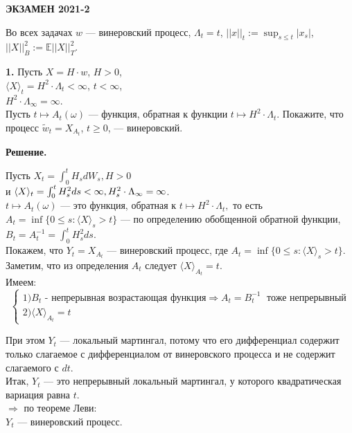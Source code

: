 \documentclass[12pt]{article}
\newcommand\E{{\mathbb E}}
\begin{document}
\centerline{\bf \Large ЭКЗАМЕН 2021-2}
\bigskip 
\bigskip
\bigskip
Во всех  задачах $w$ --- винеровский процесс, $\Lambda_t=t$, $||x||_t:=\sup_{s\le t}|x_s|$, 
$||X||_B^2:=\E ||X||^2_T$.   

\bigskip
\noindent
{\bf 1.} 
Пусть $X=H\cdot w$, $H>0$, \\
$\langle X\rangle_t=  H^2\cdot \Lambda_t<\infty$, $t<\infty$, \\
$H^2\cdot \Lambda_\infty=\infty$. \\
Пусть $t\mapsto A_t(\omega)$ ---  функция, обратная к функции  $t\mapsto H^2\cdot \Lambda_t$.
Покажите, что процесс  $\tilde w_t=X_{A_t}$, $t\ge 0$, --- винеровский. 

\smallskip
{\bf  Решение.}  

Пусть $X_t=\int_0^t H_s dW_s, H>0$ \\
и $\langle X\rangle_t=\int_0^t H_s^2 ds <\infty, \\
H_s^2\cdot\Lambda_\infty=\infty$. \\
$t\mapsto A_t(\omega)$ — это функция, обратная к $t\mapsto H^2\cdot \Lambda_t,$ то есть $A_t=\inf\{0\le s : \langle X\rangle_s>t\} $ — по определению обобщенной обратной функции,\\
 $B_t= A_t^{-1}=\int_0^t H_s^2 ds.$\\ 
Покажем, что $Y_t=X_{A_t}$ — винеровский процесс, где $A_t=\inf\{0\le s : \langle X\rangle_s>t\}$. \\
Заметим, что из определения $A_t$ следует \mbox{$\langle X\rangle_{A_t}=t$}.  \\
Имеем:
\begin{equation*} 
\begin{cases} 
1) B_t \text{ - непрерывная возрастающая функция} \Rightarrow A_t=B_t^{-1} \; \text{ тоже непрерывный}\\ 
2) \langle X\rangle_{A_t}=t 
\end{cases} 
\end{equation*} 

При этом $Y_t$ — локальный мартингал, потому что  его дифференциал содержит только слагаемое с дифференциалом от винеровского процесса и не содержит слагаемого с $dt$.\\
Итак, $Y_t$ — это непрерывный локальный мартингал, у которого квадратическая вариация равна $t$.\\
$\Rightarrow$ по теореме Леви:\\
$Y_t$ — винеровский процесс.
\end{document}
